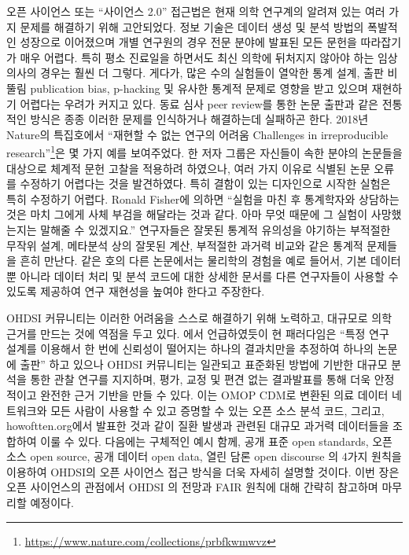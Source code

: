 \documentclass[10.5pt]{book}
\let\rmarkdownfootnote\footnote%
\def\footnote{\protect\rmarkdownfootnote}
\theoremstyle{definition}
\theoremstyle{definition}
\theoremstyle{definition}
\theoremstyle{remark}
\begin{document}
오픈 사이언스 또는 ``사이언스 2.0'' \citep{wiki:Science_2.0} 접근법은
현재 의학 연구계의 알려져 있는 여러 가지 문제를 해결하기 위해
고안되었다. 정보 기술은 데이터 생성 및 분석 방법의 폭발적인 성장으로
이어졌으며 개별 연구원의 경우 전문 분야에 발표된 모든 문헌을 따라잡기가
매우 어렵다. 특히 평소 진료일을 하면서도 최신 의학에 뒤처지지 않아야
하는 임상 의사의 경우는 훨씬 더 그렇다. 게다가, 많은 수의 실험들이
열악한 통계 설계, 출판 비뚤림 publication bias, p-hacking 및 유사한
통계적 문제로 영향을 받고 있으며 재현하기 어렵다는 우려가 커지고 있다.
동료 심사 peer review를 통한 논문 출판과 같은 전통적인 방식은 종종
이러한 문제를 인식하거나 해결하는데 실패하곤 한다. 2018년 Nature의
특집호에서 ``재현할 수 없는 연구의 어려움 Challenges in irreproducible
research''\footnote{\url{https://www.nature.com/collections/prbfkwmwvz}}은
몇 가지 예를 보여주었다. 한 저자 그룹은 자신들이 속한 분야의 논문들을
대상으로 체계적 문헌 고찰을 적용하려 하였으나, 여러 가지 이유로 식별된
논문 오류를 수정하기 어렵다는 것을 발견하였다. 특히 결함이 있는
디자인으로 시작한 실험은 특히 수정하기 어렵다. Ronald Fisher에 의하면
``실험을 마친 후 통계학자와 상담하는 것은 마치 그에게 사체 부검을
해달라는 것과 같다. 아마 무엇 때문에 그 실험이 사망했는지는 말해줄 수
있겠지요.'' \citep{wikiquote:Ronald_Fisher} 연구자들은 잘못된 통계적
유의성을 야기하는 부적절한 무작위 설계, 메타분석 상의 잘못된 계산,
부적절한 과거력 비교와 같은 통계적 문제들을 흔히 만난다.
\citep{allison_2016} 같은 호의 다른 논문에서는 물리학의 경험을 예로
들어서, 기본 데이터 뿐 아니라 데이터 처리 및 분석 코드에 대한 상세한
문서를 다른 연구자들이 사용할 수 있도록 제공하여 연구 재현성을 높여야
한다고 주장한다. \citep{Chen2018}

OHDSI 커뮤니티는 이러한 어려움을 스스로 해결하기 위해 노력하고, 대규모로
의학 근거를 만드는 것에 역점을 두고 있다. \citet{schuemie_2018b} 에서
언급하였듯이 현 패러다임은 ``특정 연구 설계를 이용해서 한 번에 신뢰성이
떨어지는 하나의 결과치만을 추정하여 하나의 논문에 출판'' 하고 있으나
OHDSI 커뮤니티는 일관되고 표준화된 방법에 기반한 대규모 분석을 통한 관찰
연구를 지지하며, 평가, 교정 및 편견 없는 결과발표를 통해 더욱 안정적이고
완전한 근거 기반을 만들 수 있다. 이는 OMOP CDM로 변환된 의료 데이터
네트워크와 모든 사람이 사용할 수 있고 증명할 수 있는 오픈 소스 분석
코드, 그리고, howoftten.org에서 발표한 것과 같이 질환 발생과 관련된
대규모 과거력 데이터들을 조합하여 이룰 수 있다. 다음에는 구체적인 예시
함께, 공개 표준 open standards, 오픈 소스 open source, 공개 데이터 open
data, 열린 담론 open discourse 의 4가지 원칙을 이용하여 OHDSI의 오픈
사이언스 접근 방식을 더욱 자세히 설명할 것이다. 이번 장은 오픈
사이언스의 관점에서 OHDSI 의 전망과 FAIR 원칙에 대해 간략히 참고하며
마무리할 예정이다.
\end{document}
